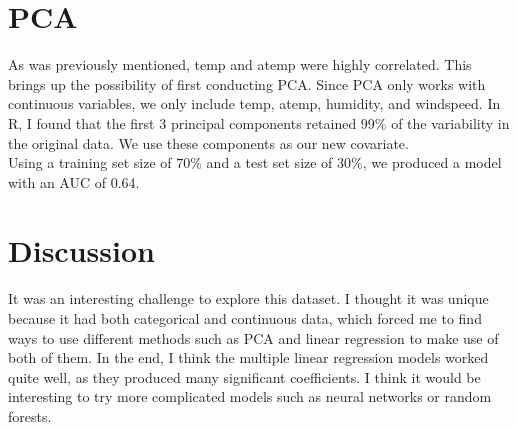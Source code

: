 \documentclass{article}
\begin{document}
\section{PCA}
\indent As was previously mentioned, temp and atemp were highly correlated. This brings up the possibility of first conducting PCA. Since PCA only works with continuous variables, we only include temp, atemp, humidity, and windspeed. In R, I found that the first 3 principal components retained $99\%$ of the variability in the original data. We use these components as our new covariate. \\
\indent Using a training set size of $70\%$ and a test set size of $30\%$, we produced a model with an AUC of 0.64.

\section*{Discussion}
It was an interesting challenge to explore this dataset. I thought it was unique because it had both categorical and continuous data, which forced me to find ways to use different methods such as PCA and linear regression to make use of both of them. In the end, I think the multiple linear regression models worked quite well, as they produced many significant coefficients. I think it would be interesting to try more complicated models such as neural networks or random forests.
\end{document}
